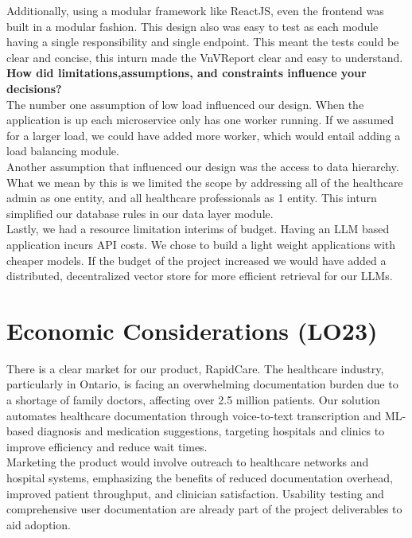 \documentclass{article}
\begin{document}
Additionally, using a modular framework like ReactJS, even the frontend was built in a modular fashion. This design also was easy to test as each module having a single responsibility and single endpoint. This meant the tests could be clear and concise, this inturn made the VnVReport clear and easy to understand.\\

\noindent
\textbf{How did limitations,assumptions, and constraints influence your decisions?}\\
The number one assumption of low load influenced our design. When the application is up each microservice only has one worker running. If we assumed for a larger load, we could have added more worker, which would entail adding a load balancing module.\\

Another assumption that influenced our design was the access to data hierarchy. What we mean by this is we limited the scope by addressing all of the healthcare admin as one entity, and all healthcare professionals as 1 entity. This inturn simplified our database rules in our data layer module. \\

Lastly, we had a resource limitation interims of budget. Having an LLM based application incurs API costs. We chose to build a light weight applications with cheaper models. If the budget of the project increased we would have added a distributed, decentralized vector store for more efficient retrieval for our LLMs.\\



 \section{Economic Considerations (LO23)}

 There is a clear market for our product, RapidCare. The healthcare industry, particularly in Ontario, is facing an overwhelming documentation burden due to a shortage of family doctors, affecting over 2.5 million patients. Our solution automates healthcare documentation through voice-to-text transcription and ML-based diagnosis and medication suggestions, targeting hospitals and clinics to improve efficiency and reduce wait times. \\
 
 
 \noindent
 Marketing the product would involve outreach to healthcare networks and hospital systems, emphasizing the benefits of reduced documentation overhead, improved patient throughput, and clinician satisfaction. Usability testing and comprehensive user documentation are already part of the project deliverables to aid adoption. \\
 
\end{document}
